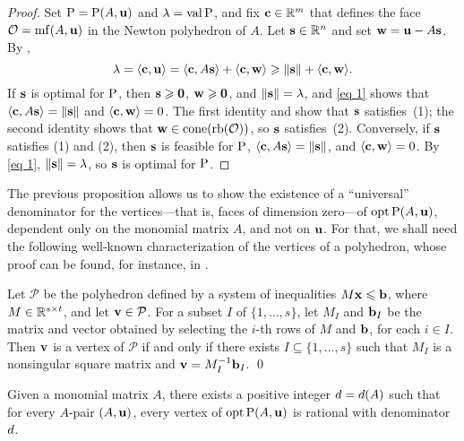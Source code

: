 \documentclass{amsart}
\begin{document}
\begin{proof}
   Set $\mathrm{P} = \mathrm{P}(A, \mathbf{u})$ and $\lambda = \operatorname{val} \mathrm{P} $, and fix $\mathbf{c} \in \mathbb{R}^m$ that defines the face $\mathcal{O} = \operatorname{mf}(A, \mathbf{u})$ in the Newton polyhedron of $A$.
   Let $\mathbf{s} \in \mathbb{R}^n$ and set $\mathbf{w} = \mathbf{u} - A\mathbf{s}$.
   By ,
   \begin{equation}\label{eq 1}
      \lambda = \langle \mathbf{c}, \mathbf{u} \rangle = \langle \mathbf{c}, A \mathbf{s} \rangle + \langle \mathbf{c}, \mathbf{w} \rangle \geqslant \| \mathbf{s} \| + \langle \mathbf{c}, \mathbf{w} \rangle.
   \end{equation}
   If $\mathbf{s}$ is optimal for $\mathrm{P}$, then $\mathbf{s} \geqslant \mathbf{0}$, $\mathbf{w} \geqslant \mathbf{0}$, and $\| \mathbf{s} \| = \lambda$, and \eqref{eq 1} shows that $\langle \mathbf{c}, A \mathbf{s} \rangle = \| \mathbf{s} \|$ and $\langle \mathbf{c}, \mathbf{w} \rangle = 0$.
   The first identity and  show that $\mathbf{s}$ satisfies~(1); the second identity shows that $\mathbf{w}\in \operatorname{cone}(\operatorname{rb}(\mathcal{O}))$, so $\mathbf{s}$ satisfies~(2).
   Conversely, if $\mathbf{s}$ satisfies (1) and (2), then $\mathbf{s}$ is feasible for $\mathrm{P}$, $\langle \mathbf{c}, A \mathbf{s} \rangle = \| \mathbf{s} \|$, and $\langle \mathbf{c}, \mathbf{w} \rangle = 0$.
   By \eqref{eq 1}, $\| \mathbf{s} \| = \lambda$, so $\mathbf{s}$ is optimal for $\mathrm{P}$.
\end{proof}

The previous proposition allows us to show the existence of a ``universal'' denominator for the vertices---that is, faces of dimension zero---of $\operatorname{opt}\mathrm{P}(A,\mathbf{u})$, dependent only on the monomial matrix $A$, and not on $\mathbf{u}$.
For that, we shall need the following well-known characterization of the vertices of a polyhedron, whose proof can be found, for instance, in \cite[Theorem~3.34]{conforti+etal.integer_programming}.

\begin{lemma}
   \label{prop: characterization of vertices}
   Let $\mathcal{P}$ be the polyhedron defined by a system of inequalities $M \mathbf{x} \leqslant \mathbf{b}$, where $M\in \mathbb{R}^{s\times t}$, and let $\mathbf{v} \in \mathcal{P}$.
   For a subset $I$ of $\{1,\ldots,s\}$, let $M_I$ and $\mathbf{b}_I$ be the matrix and vector obtained by selecting the $i$-th rows of $M$ and $\mathbf{b}$, for each $i\in I$.
   Then $\mathbf{v}$ is a vertex of $\mathcal{P}$ if and only if there exists $I \subseteq \{1,\ldots,s\}$ such that $M_I$ is a nonsingular square matrix and $\mathbf{v} = M_I^{-1}\mathbf{b}_I$.
\qed
\end{lemma}

\begin{theorem}
\label{uniform denominators for vertices:  T}
Given a monomial matrix $A$, there exists a positive integer $d = d(A)$ such that for every $A$-pair $(A, \mathbf{u})$, every vertex of $\operatorname{opt} \mathrm{P}(A, \mathbf{u})$ is rational with denominator $d$.
\end{theorem}
\end{document}
